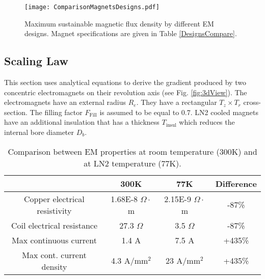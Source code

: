 \begin{figure}
\texttt{[image: ComparisonMagnetsDesigns.pdf]}
	\caption{ Maximum sustainable magnetic flux density  by different EM designs. Magnet specifications are given in Table \ref{DesignsCompare}.
	\label{fig:ComparisonMagnetsDesigns}}
\end{figure}

\subsection{Scaling Law}

This section uses analytical equations to derive the gradient produced by two concentric electromagnets on their revolution axis (see Fig. \ref{fig:3dView}). The electromagnets have an external radius $R_e$. They have a rectangular $T_z \times T_r$ cross-section. The filling factor $F_{\textrm{Fill}} $ is assumed to be equal to 0.7. LN2 cooled magnets have an additional insulation that has a thickness $T_{\textrm{insul}}$ which reduces the internal bore diameter $D_b$.

\begin{table}[]
\centering
\caption{Comparison between EM properties at room temperature (300K) and at LN2 temperature (77K).}
\label{CoolingComparison}
\begin{tabular}{@{}cccc@{}}
\toprule
 & 300K & 77K & Difference \\ \midrule
Copper electrical resistivity & 1.68E-8 $\Omega\cdot$m & 2.15E-9 $\Omega\cdot$m & -87\% \\ 
Coil electrical resistance & 27.3 $\Omega$ & 3.5 $\Omega$ & -87\% \\ 
Max continuous current & 1.4 A & 7.5 A & +435\% \\ 
Max cont. current density & 4.3 A/mm$^2$ & 23 A/mm$^2$ & +435\% \\ 
\bottomrule
\end{tabular}
\end{table}

